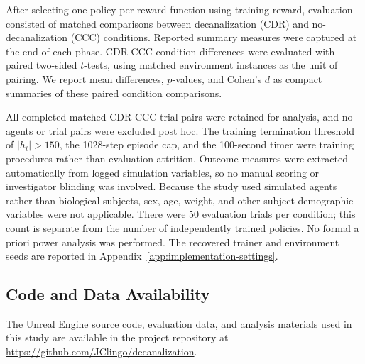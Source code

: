 \documentclass[12pt,fleqn]{article}
\begin{document}
After selecting one policy per reward function using training reward, evaluation consisted of matched comparisons between decanalization (CDR) and no-decanalization (CCC) conditions. Reported summary measures were captured at the end of each phase. CDR-CCC condition differences were evaluated with paired two-sided $t$-tests, using matched environment instances as the unit of pairing. We report mean differences, $p$-values, and Cohen's $d$ as compact summaries of these paired condition comparisons.

All completed matched CDR-CCC trial pairs were retained for analysis, and no agents or trial pairs were excluded post hoc. The training termination threshold of $|h_t|>150$, the 1028-step episode cap, and the 100-second timer were training procedures rather than evaluation attrition. Outcome measures were extracted automatically from logged simulation variables, so no manual scoring or investigator blinding was involved. Because the study used simulated agents rather than biological subjects, sex, age, weight, and other subject demographic variables were not applicable. There were 50 evaluation trials per condition; this count is separate from the number of independently trained policies. No formal a priori power analysis was performed. The recovered trainer and environment seeds are reported in Appendix~\ref{app:implementation-settings}.

\subsection{Code and Data Availability}

The Unreal Engine source code, evaluation data, and analysis materials used in this study are available in the project repository at \url{https://github.com/JClingo/decanalization}.

\end{document}
